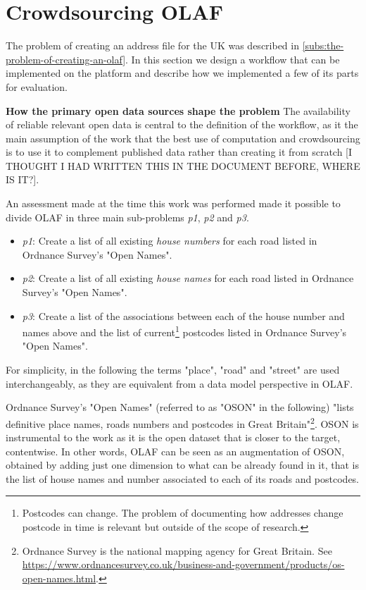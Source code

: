 \section{Crowdsourcing OLAF}

The problem of creating an address file for the UK was described in \ref{subs:the-problem-of-creating-an-olaf}. In this section we design a workflow that can be implemented on the platform and describe how we implemented a few of its parts for evaluation.

\textbf{How the primary open data sources shape the problem} The availability of reliable relevant open data is central to the definition of the workflow, as it the main assumption of the work that the best use of computation and crowdsourcing is to use it to complement published data rather than creating it from scratch [I THOUGHT I HAD WRITTEN THIS IN THE DOCUMENT BEFORE, WHERE IS IT?]. 

An assessment made at the time this work was performed made it possible to divide OLAF in three main sub-problems {\it p1}, {\it p2} and {\it p3}. 
    
\begin{itemize}
    \item {\it p1}: Create a list of all existing {\it house numbers} for each road listed in Ordnance Survey's "Open Names".
    \item {\it p2}: Create a list of all existing {\it house names} for each road listed in Ordnance Survey's "Open Names".
    \item {\it p3}: Create a list of the associations between each of the house number and names above and the list of current\footnote{Postcodes can change. The problem of documenting how addresses change postcode in time is relevant but outside of the scope of research.} postcodes listed in Ordnance Survey's "Open Names". 
\end{itemize}

For simplicity, in the following the terms "place", "road" and "street" are used interchangeably, as they are equivalent from a data model perspective in OLAF.

Ordnance Survey's "Open Names" (referred to as "OSON" in the following) "lists definitive place names, roads numbers and postcodes in Great Britain"\footnote{Ordnance Survey is the national mapping agency for Great Britain. See \url{https://www.ordnancesurvey.co.uk/business-and-government/products/os-open-names.html}.}. OSON is instrumental to the work as it is the open dataset that is closer to the target, contentwise. In other words, OLAF can be seen as an augmentation of OSON, obtained by adding just one dimension to what can be already found in it, that is the list of house names and number associated to each of its roads and postcodes. 
    
